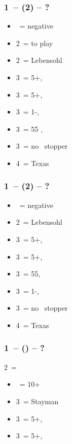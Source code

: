 \documentclass[12pt, a4paper]{report}
\begin{document}
\subsubsection*{1\ntx\ -- (2\hearts) -- ?}
\begin{itemize}
    \item \dbl\ = negative
    \item 2\spades\ = to play
    \item 2\nt\ = Lebensohl
    \item 3\clubs\ = 5+\diams, \invp
    \item 3\diams\ = 5+\spades, \invp
    \item 3\hearts\ = 1-\hearts, \invp
    \item 3\spades\ = 55 \minor, \gf
    \item 3\nt\ = no \hearts\ stopper
    \item 4\hearts\ = Texas
\end{itemize}

\subsubsection*{1\ntx\ -- (2\spades) -- ?}
\begin{itemize}
    \item \dbl\ = negative
    \item 2\nt\ = Lebensohl
    \item 3\clubs\ = 5+\diams, \invp
    \item 3\diams\ = 5+\hearts, \invp
    \item 3\hearts\ = 55\minor, \gf
    \item 3\spades\ = 1-\spades, \invp
    \item 3\nt\ = no \spades\ stopper
    \item 4\diams\ = Texas
\end{itemize}

\subsubsection*{1\ntx\ -- (\alrts{2\nt}) -- ?}
2\nt\ = \minor
\begin{itemize}
    \item \dbl\ = 10+
    \item 3\clubs\ = Stayman
    \item 3\diams\ = 5+\hearts, \invp
    \item 3\hearts\ = 5+\spades, \invp
\end{itemize}
\end{document}
